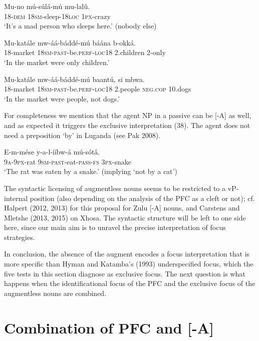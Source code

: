 \documentclass[output=paper]{langsci/langscibook}
\begin{document}
\ea
\gll   Mu-no    mú-súlá-mú    mu-lalû.\\
       18-\textsc{dem}  \textsc{18sm}{}-sleep-\textsc{18loc}  \textsc{1px}{}-crazy\\
\glt   ‘It’s a mad person who sleeps here.’ (nobody else)
\z

\ea
\gll   Mu-katále  mw-áá-báddé-mú      báána    b-okká.\\
       18-market  \textsc{18sm}{}-\textsc{past}{}-be.\textsc{perf}{}-\textsc{loc18}  2.children  2-only\\
\glt   ‘In the market were only children.’
\z

\ea
\gll   Mu-katále  mw-áá-báddé-mú    baantú,    si    mbwa.\\
       18-market  \textsc{18sm}{}-\textsc{past}{}-be.\textsc{perf}{}-\textsc{loc18}  2.people  \textsc{neg}.\textsc{cop}  10.dogs\\
\glt   ‘In the market were people, not dogs.’
\z

For completeness we mention that the agent NP in a passive can be [-A] as well, and as expected it triggers the exclusive interpretation (38). The agent does not need a preposition ‘by’ in Luganda (see Pak 2008).

\ea
\gll   E-m-mése  y-a-l-ííbw-á      mú-sótâ.\\
       \textsc{9a}{}-\textsc{9px}{}-rat  \textsc{9sm}{}-\textsc{past}{}-eat-\textsc{pass}{}-\textsc{fs}  \textsc{3px}{}-snake\\
\glt   ‘The rat was eaten by a snake.’ (implying ‘not by a cat’)
\z

The syntactic licensing of augmentless nouns seems to be restricted to a vP-internal position (also depending on the analysis of the PFC as a cleft or not); cf. Halpert (2012, 2013) for this proposal for Zulu [-A] nouns, and Carstens and Mletshe (2013, 2015) on Xhosa. The syntactic structure will be left to one side here, since our main aim is to unravel the precise interpretation of focus strategies.

  In conclusion, the absence of the augment encodes a focus interpretation that is more specific than Hyman and Katamba’s (1993) underspecified focus, which the five tests in this section diagnose as exclusive focus. The next question is what happens when the identificational focus of the PFC and the exclusive focus of the augmentless nouns are combined.

\section{Combination of PFC and [-A]}
 
\end{document}
